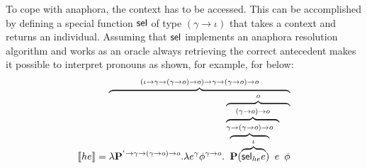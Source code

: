 To cope with anaphora, the context has to be accessed. This can be accomplished by defining a special function $\mathsf{sel}$ of type $(\gamma \rightarrow \iota)$ that takes a context and returns an individual. Assuming that $\mathsf{sel}$ implements an anaphora resolution algorithm and  works as an oracle always retrieving the correct antecedent makes it possible to interpret pronouns as shown, for example, for  below:
\begin{align}
\I{he} =  \overbrace{\lambda \P2^{^\iota \rightarrow \gamma \rightarrow (\gamma \rightarrow o) \rightarrow o}. \lambda e^{\gamma} \phi^{\gamma \rightarrow o}. \overbrace{\overbrace{\overbrace{\P2 ( \overbrace{\selK_{he} e}^{\iota} )}^{\gamma \rightarrow (\gamma \rightarrow o) \rightarrow o} e}^{ (\gamma \rightarrow o) \rightarrow o} \ \phi }^{o}}^{(\iota \rightarrow \gamma \rightarrow (\gamma \rightarrow o) \rightarrow o) \rightarrow \gamma \rightarrow (\gamma \rightarrow o) \rightarrow o}  \label{eq:he:2006}
\end{align}


